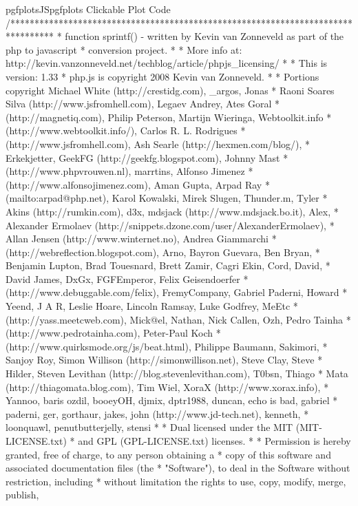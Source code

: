 \begin{insDLJS}[processAnnotatedPlot]{pgfplotsJS}{pgfplots Clickable Plot Code}
/*********************************************************************************
 * function sprintf() - written by Kevin van Zonneveld as part of the php to javascript
 * conversion project.
 *
 * More info at: http://kevin.vanzonneveld.net/techblog/article/phpjs_licensing/
 *
 * This is version: 1.33
 * php.js is copyright 2008 Kevin van Zonneveld.
 *
 * Portions copyright Michael White (http://crestidg.com), _argos, Jonas
 * Raoni Soares Silva (http://www.jsfromhell.com), Legaev Andrey, Ates Goral
 * (http://magnetiq.com), Philip Peterson, Martijn Wieringa, Webtoolkit.info
 * (http://www.webtoolkit.info/), Carlos R. L. Rodrigues
 * (http://www.jsfromhell.com), Ash Searle (http://hexmen.com/blog/),
 * Erkekjetter, GeekFG (http://geekfg.blogspot.com), Johnny Mast
 * (http://www.phpvrouwen.nl), marrtins, Alfonso Jimenez
 * (http://www.alfonsojimenez.com), Aman Gupta, Arpad Ray
 * (mailto:arpad@php.net), Karol Kowalski, Mirek Slugen, Thunder.m, Tyler
 * Akins (http://rumkin.com), d3x, mdsjack (http://www.mdsjack.bo.it), Alex,
 * Alexander Ermolaev (http://snippets.dzone.com/user/AlexanderErmolaev),
 * Allan Jensen (http://www.winternet.no), Andrea Giammarchi
 * (http://webreflection.blogspot.com), Arno, Bayron Guevara, Ben Bryan,
 * Benjamin Lupton, Brad Touesnard, Brett Zamir, Cagri Ekin, Cord, David,
 * David James, DxGx, FGFEmperor, Felix Geisendoerfer
 * (http://www.debuggable.com/felix), FremyCompany, Gabriel Paderni, Howard
 * Yeend, J A R, Leslie Hoare, Lincoln Ramsay, Luke Godfrey, MeEtc
 * (http://yass.meetcweb.com), Mick@el, Nathan, Nick Callen, Ozh, Pedro Tainha
 * (http://www.pedrotainha.com), Peter-Paul Koch
 * (http://www.quirksmode.org/js/beat.html), Philippe Baumann, Sakimori,
 * Sanjoy Roy, Simon Willison (http://simonwillison.net), Steve Clay, Steve
 * Hilder, Steven Levithan (http://blog.stevenlevithan.com), T0bsn, Thiago
 * Mata (http://thiagomata.blog.com), Tim Wiel, XoraX (http://www.xorax.info),
 * Yannoo, baris ozdil, booeyOH, djmix, dptr1988, duncan, echo is bad, gabriel
 * paderni, ger, gorthaur, jakes, john (http://www.jd-tech.net), kenneth,
 * loonquawl, penutbutterjelly, stensi
 *
 * Dual licensed under the MIT (MIT-LICENSE.txt)
 * and GPL (GPL-LICENSE.txt) licenses.
 *
 * Permission is hereby granted, free of charge, to any person obtaining a
 * copy of this software and associated documentation files (the
 * "Software"), to deal in the Software without restriction, including
 * without limitation the rights to use, copy, modify, merge, publish,

\end{insDLJS}
